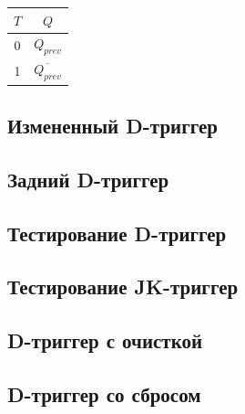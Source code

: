 \documentclass[a4paper,14pt]{article}
\begin{document}
\begin{table}[]
	\begin{center}
		\begin{flushleft}
		\end{flushleft}
		\label{tab:t_flip_flop}
		\begin{tabular}{|c|c|}
			\hline
			$T$ & $Q$                   \\ \hline
			0   & $Q_{prev}$            \\ \hline
			1   & $\overline{Q_{prev}}$ \\ \hline
		\end{tabular}
	\end{center}
\end{table}

\subsection{Измененный D-триггер}



\subsection{Задний D-триггер}



\subsection{Тестирование D-триггер}

\subsection{Тестирование JK-триггер}

\subsection{D-триггер с очисткой}


\subsection{D-триггер со сбросом}

\end{document}
